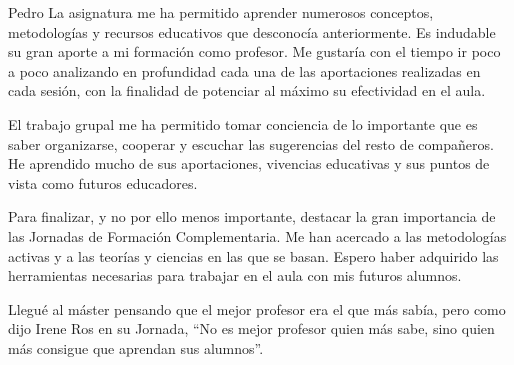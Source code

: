
\begin{opin}{\pedrocolor}{Pedro}
La asignatura me ha permitido aprender numerosos conceptos, metodologías y recursos educativos que desconocía anteriormente. Es indudable su gran aporte a mi formación como profesor. Me gustaría con el tiempo ir poco a poco analizando en profundidad cada una de las aportaciones realizadas en cada sesión, con la finalidad de potenciar al máximo su efectividad en el aula. 

El trabajo grupal me ha permitido tomar conciencia de lo importante que es saber organizarse, cooperar y escuchar las sugerencias del resto de compañeros. He aprendido mucho de sus aportaciones, vivencias educativas y sus puntos de vista como futuros educadores.

Para finalizar, y no por ello menos importante, destacar la gran importancia de las Jornadas de Formación Complementaria. Me han acercado a las metodologías activas y a las teorías y ciencias en las que se basan. Espero haber adquirido las herramientas necesarias para trabajar en el aula con mis futuros alumnos. 

Llegué al máster pensando que el mejor profesor era el que más sabía, pero como dijo Irene Ros en su Jornada, “No es mejor profesor quien más sabe, sino quien más consigue que aprendan sus alumnos”.
\end{opin}